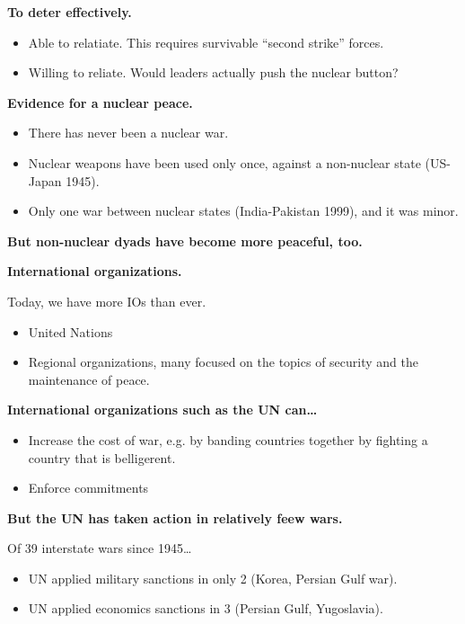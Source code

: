 \documentclass{article}
\begin{document}
{\bf To deter effectively.}

\begin{itemize}
  \item Able to relatiate. This requires survivable ``second strike'' forces.
  \item Willing to reliate. Would leaders actually push the nuclear button?
\end{itemize}

{\bf Evidence for a nuclear peace.}

\begin{itemize}
  \item There has never been a nuclear war.
  \item Nuclear weapons have been used only once, against a non-nuclear state (US-Japan 1945).
  \item Only one war between nuclear states (India-Pakistan 1999), and it was minor.
\end{itemize}

{\bf But non-nuclear dyads have become more peaceful, too.}

{\bf International organizations.}

Today, we have more IOs than ever.

\begin{itemize}
  \item United Nations
  \item Regional organizations, many focused on the topics of security and the maintenance of peace.
\end{itemize}

{\bf International organizations such as the UN can\ldots}

\begin{itemize}
  \item Increase the cost of war, e.g. by banding countries together by fighting a country that is belligerent.
  \item Enforce commitments
\end{itemize}

{\bf But the UN has taken action in relatively feew wars.}

Of 39 interstate wars since 1945\ldots

\begin{itemize}
  \item UN applied military sanctions in only 2 (Korea, Persian Gulf war).
  \item UN applied economics sanctions in 3 (Persian Gulf, Yugoslavia).
\end{itemize}
\end{document}
